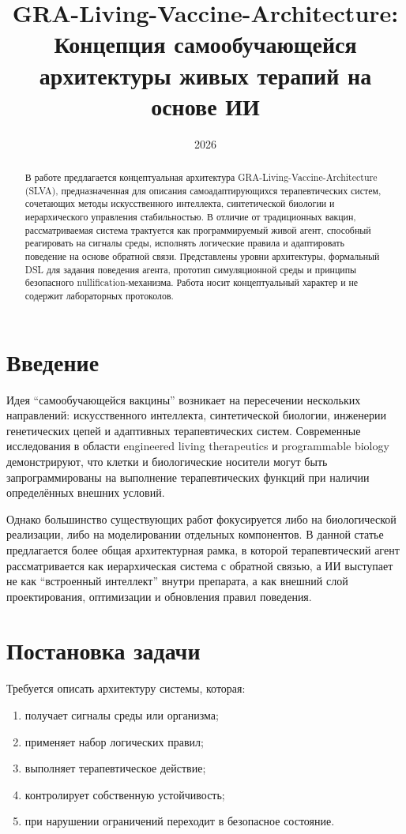 \documentclass[12pt,a4paper]{article}
\title{GRA-Living-Vaccine-Architecture:\\
Концепция самообучающейся архитектуры живых терапий на основе ИИ}
\author{ }
\date{2026}
\begin{document}
\maketitle

\begin{abstract}
В работе предлагается концептуальная архитектура GRA-Living-Vaccine-Architecture (SLVA), предназначенная для описания самоадаптирующихся терапевтических систем, сочетающих методы искусственного интеллекта, синтетической биологии и иерархического управления стабильностью. В отличие от традиционных вакцин, рассматриваемая система трактуется как программируемый живой агент, способный реагировать на сигналы среды, исполнять логические правила и адаптировать поведение на основе обратной связи. Представлены уровни архитектуры, формальный DSL для задания поведения агента, прототип симуляционной среды и принципы безопасного nullification-механизма. Работа носит концептуальный характер и не содержит лабораторных протоколов.
\end{abstract}

\section{Введение}

Идея ``самообучающейся вакцины'' возникает на пересечении нескольких направлений: искусственного интеллекта, синтетической биологии, инженерии генетических цепей и адаптивных терапевтических систем. Современные исследования в области engineered living therapeutics и programmable biology демонстрируют, что клетки и биологические носители могут быть запрограммированы на выполнение терапевтических функций при наличии определённых внешних условий.

Однако большинство существующих работ фокусируется либо на биологической реализации, либо на моделировании отдельных компонентов. В данной статье предлагается более общая архитектурная рамка, в которой терапевтический агент рассматривается как иерархическая система с обратной связью, а ИИ выступает не как ``встроенный интеллект'' внутри препарата, а как внешний слой проектирования, оптимизации и обновления правил поведения.

\section{Постановка задачи}

Требуется описать архитектуру системы, которая:

\begin{enumerate}[label=\arabic*)]
    \item получает сигналы среды или организма;
    \item применяет набор логических правил;
    \item выполняет терапевтическое действие;
    \item контролирует собственную устойчивость;
    \item при нарушении ограничений переходит в безопасное состояние.
\end{enumerate}
\end{document}
